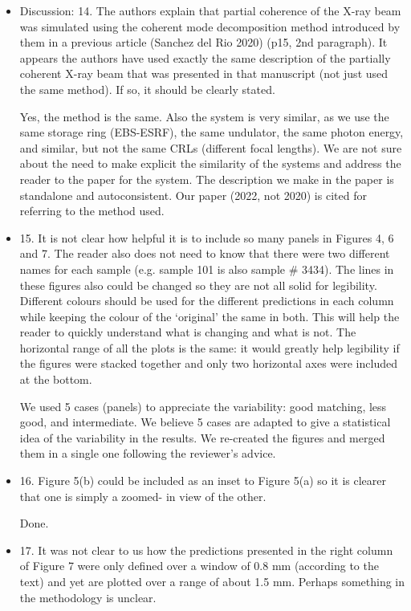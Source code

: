 \documentclass[11pt]{letter} %
\newcommand{\inred}[1]{{\color{red}#1}}
\begin{document}
\begin{letter}{}
\begin{itemize}
    \item Discussion: 14. The authors explain that partial coherence of the X-ray beam was simulated using the coherent mode decomposition method introduced by them in a previous article (Sanchez del Rio 2020) (p15, 2nd paragraph). It appears the authors have used exactly the same description of the partially coherent X-ray beam that was presented in that manuscript (not just used the same method). If so, it should be clearly stated.
    
    \inred{Yes, the method is the same. Also the system is very similar, as we use the same storage ring (EBS-ESRF), the same undulator, the same photon energy, and similar, but not the same CRLs (different focal lengths). We are not sure about the need to make explicit the similarity of the systems and address the reader to the paper for the system. The description we make in the paper is standalone and autoconsistent. Our paper (2022, not 2020) is cited for referring to the method used.}
    
    \item 15. It is not clear how helpful it is to include so many panels in Figures 4, 6 and 7. The reader also does not need to know that there were two different names for each sample (e.g. sample 101 is also sample \# 3434). The lines in these figures also could be changed so they are not all solid for legibility. Different colours should be used for the different predictions in each column while keeping the colour of the ‘original’ the same in both. This will help the reader to quickly understand what is changing and what is not. The horizontal range of all the plots is the same: it would greatly help legibility if the figures were stacked together and only two horizontal axes were included at the bottom.
    
    \inred{We used 5 cases (panels) to appreciate the variability: good matching, less good, and intermediate. We believe 5 cases are adapted to give a statistical idea of the variability in the results. We re-created the figures and merged them in a single one following  the reviewer's advice.}
    
    \item 16. Figure 5(b) could be included as an inset to Figure 5(a) so it is clearer that one is simply a zoomed- in view of the other.
    
    \inred{Done.}
    
    \item 17. It was not clear to us how the predictions presented in the right column of Figure 7 were only defined over a window of 0.8 mm (according to the text) and yet are plotted over a range of about 1.5 mm. Perhaps something in the methodology is unclear.
    

\end{itemize}
\end{letter}
\end{document}
